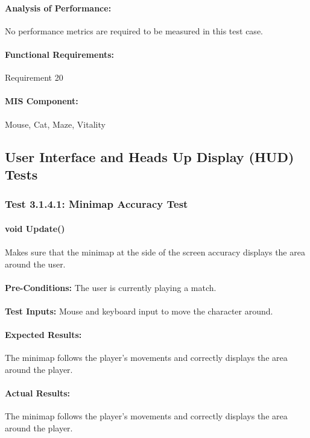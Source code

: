 \documentclass{article}
\begin{document}
    \paragraph{Analysis of Performance:} No performance metrics are required to be measured in this test case.
    \paragraph{Functional Requirements:} Requirement 20
    \paragraph{MIS Component:} Mouse, Cat, Maze,  Vitality
    
    \subsection{User Interface and Heads Up Display (HUD) Tests}
    \subsubsection{Test 3.1.4.1: Minimap Accuracy Test}
    \paragraph{}\textbf{void Update()} 
    \paragraph{} Makes sure that the minimap at the side of the screen accuracy displays the area around the user.
    \paragraph{}\textbf{Pre-Conditions:} The user is currently playing a match.
    \paragraph{}\textbf{Test Inputs:} Mouse and keyboard input to move the character around.
    \paragraph{Expected Results:} The minimap follows the player's movements and correctly displays the area around the player.
    \paragraph{Actual Results:} The minimap follows the player's movements and correctly displays the area around the player.
\end{document}
